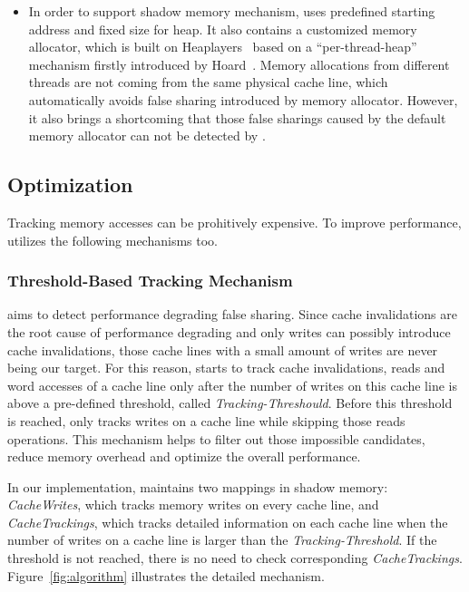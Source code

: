 \begin{itemize}
\item
In order to support shadow memory mechanism,  uses predefined starting address and 
fixed size for heap. It also contains a customized memory allocator, which is built on 
Heaplayers~\cite{heaplayers} based on a ``per-thread-heap'' mechanism firstly introduced 
by Hoard~\cite{Hoard}. Memory allocations from different threads 
are not coming from the same physical cache line, which automatically avoids false sharing 
introduced by memory allocator.
However, it also brings a shortcoming that those false sharings caused by the default memory 
allocator can not be detected by . 

\end{itemize} 
 
\subsection{Optimization}
\label{optimization}
Tracking memory accesses can be prohitively expensive. To improve 
performance,  utilizes the following  mechanisms too. 

\subsubsection{Threshold-Based Tracking Mechanism}
\Defaults{} aims to detect performance degrading false sharing.
Since cache invalidations are the root cause of performance degrading and only writes 
can possibly introduce cache invalidations, 
those cache lines with a small amount of writes are never being our target.
For this reason,  starts to track cache invalidations, reads and word accesses 
of a cache line only after the number of writes on this cache line is above a
pre-defined threshold, called {\it Tracking-Threshould}. 
Before this threshold is reached,  only tracks writes on a cache line while skipping those 
reads operations. 
This mechanism helps to filter out
those impossible candidates, reduce memory overhead and optimize the overall performance. 

In our implementation,  maintains two mappings in shadow memory: 
{\it CacheWrites}, which tracks memory writes on every cache line, 
and {\it CacheTrackings}, which tracks detailed information 
on each cache line when the number of writes on a cache line is larger than
the {\it Tracking-Threshold}. 
If the threshold is not reached, there is no need to check corresponding {\it CacheTrackings}. 
Figure~\ref{fig:algorithm} illustrates the detailed mechanism.

